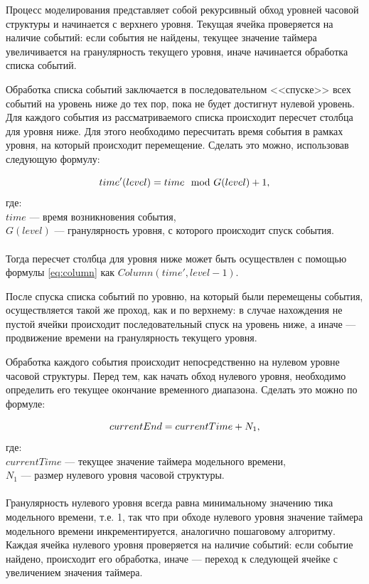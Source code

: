 Процесс моделирования представляет собой рекурсивный обход уровней часовой структуры и начинается с верхнего уровня. Текущая ячейка проверяется на наличие событий: если события не найдены, текущее значение таймера увеличивается на гранулярность текущего уровня, иначе начинается обработка списка событий.

Обработка списка событий заключается в последовательном <<спуске>> всех событий на уровень ниже до тех пор, пока не будет достигнут нулевой уровень. Для каждого события из рассматриваемого списка происходит пересчет столбца для уровня ниже. Для этого необходимо пересчитать время события в рамках уровня, на который происходит перемещение. Сделать это можно, использовав следующую формулу:

\begin{equation}
	time'(level) =  time \mod G(level) + 1 {,} \\
\end{equation}
где: \\
$time$ --- время возникновения события, \\
$G(level)$ --- гранулярность уровня, с которого происходит спуск события. \\ \\

Тогда пересчет столбца для уровня ниже может быть осуществлен с помощью формулы \ref{eq:column} как $Column(time', level - 1)$.

После спуска списка событий по уровню, на который были перемещены события, осуществляется такой же проход, как и по верхнему: в случае нахождения не пустой ячейки происходит последовательный спуск на уровень ниже, а иначе --- продвижение времени на гранулярность текущего уровня.

Обработка каждого события происходит непосредственно на нулевом уровне часовой структуры. Перед тем, как начать обход нулевого уровня, необходимо определить его текущее окончание временного диапазона. Сделать это можно по формуле:

\begin{equation}
	currentEnd = currentTime + N_1 {,} \\
\end{equation}
где: \\
$currentTime$ --- текущее значение таймера модельного времени, \\
$N_1 $ --- размер нулевого уровня часовой структуры. \\ \\

Гранулярность нулевого уровня всегда равна минимальному значению тика модельного времени, т.е. 1, так что при обходе нулевого уровня значение таймера модельного времени инкрементируется, аналогично пошаговому алгоритму. Каждая ячейка нулевого уровня проверяется на наличие событий:
если событие найдено, происходит его обработка, иначе --- переход к следующей ячейке с увеличением значения таймера.

